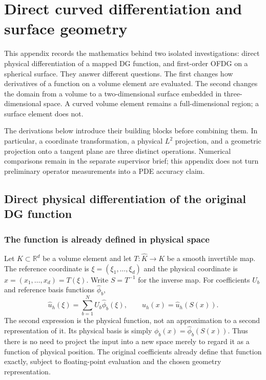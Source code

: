 \chapter{Direct curved differentiation and surface geometry}
\label{app:geometry-extensions}

This appendix records the mathematics behind two isolated investigations:
direct physical differentiation of a mapped DG function, and first-order
OFDG on a spherical surface. They answer different questions. The first
changes how derivatives of a function on a volume element are evaluated.
The second changes the domain from a volume to a two-dimensional surface
embedded in three-dimensional space. A curved volume element remains a
full-dimensional region; a surface element does not.


The derivations below introduce their building blocks before combining them.
In particular, a coordinate transformation, a physical $L^2$ projection,
and a geometric projection onto a tangent plane are three distinct operations.
Numerical comparisons remain in the separate supervisor brief; this appendix
does not turn preliminary operator measurements into a PDE accuracy claim.

\section{Direct physical differentiation of the original DG function}
\label{sec:appendix-direct}

\subsection{The function is already defined in physical space}
Let $K\subset\mathbb R^d$ be a volume element and let
$T:\widehat K\longrightarrow K$ be a smooth invertible map. The reference
coordinate is $\xi=(\xi_1,\ldots,\xi_d)$ and the physical coordinate is
$x=(x_1,\ldots,x_d)=T(\xi)$. Write $S=T^{-1}$ for the inverse map.
For coefficients $U_b$ and reference basis functions $\widehat\phi_b$,
\begin{equation}
 \widehat u_h(\xi)=\sum_{b=1}^N U_b\widehat\phi_b(\xi),
 \qquad u_h(x)=\widehat u_h(S(x)).
 \label{eq:app-pullback}
\end{equation}
The second expression is the physical function, not an approximation to a
second representation of it. Its physical basis is simply
$\phi_b(x)=\widehat\phi_b(S(x))$. Thus there is no need to project the input
into a new space merely to regard it as a function of physical position.
The original coefficients already define that function exactly, subject to
floating-point evaluation and the chosen geometry representation.

